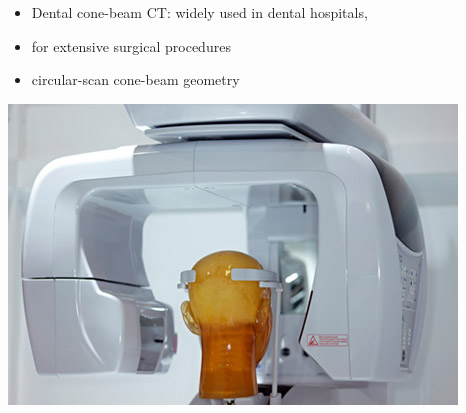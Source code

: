 \documentclass{beamer}
\begin{document}
\begin{frame}
	\begin{itemize}	
		\item Dental cone-beam CT: widely used in dental hospitals, 
		\item for extensive surgical procedures
		\item circular-scan cone-beam geometry
	\end{itemize}
	\center
		\includegraphics[scale=0.3]{media/dental_cone_beam.jpg}
\end{frame}
\end{document}
